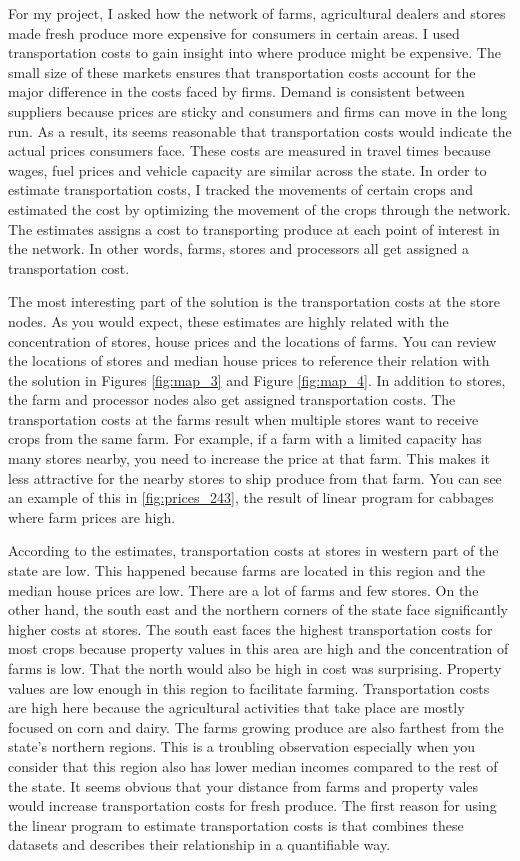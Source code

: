 \documentclass{report}
\begin{document}
For my project, I asked how the network of farms, agricultural dealers and stores made fresh produce more expensive for consumers in certain areas. I used transportation costs to gain insight into where produce might be expensive. The small size of these markets ensures that transportation costs account for the major difference in the costs faced by firms. Demand is consistent between suppliers because prices are sticky and consumers and firms can move in the long run. As a result, its seems reasonable that transportation costs would indicate the actual prices consumers face. These costs are measured in travel times because wages, fuel prices and vehicle capacity are similar across the state. In order to estimate transportation costs, I tracked the movements of certain crops and estimated the cost by optimizing the movement of the crops through the network. The estimates assigns a cost to transporting produce at each point of interest in the network. In other words, farms, stores and processors all get assigned a transportation cost.

The most interesting part of the solution is the transportation costs at the store nodes. As you would expect, these estimates are highly related with the concentration of stores, house prices and the locations of farms. You can review the locations of stores and median house prices to reference their relation with the solution in Figures \ref{fig:map_3} and Figure \ref{fig:map_4}. In addition to stores, the farm and processor nodes also get assigned transportation costs. The transportation costs at the farms result when multiple stores want to receive crops from the same farm. For example, if a farm with a limited capacity has many stores nearby, you need to increase the price at that farm. This makes it less attractive for the nearby stores to ship produce from that farm. You can see an example of this in \ref{fig:prices_243}, the result of linear program for cabbages where farm prices are high.

According to the estimates, transportation costs at stores in western part of the state are low. This happened because farms are located in this region and the median house prices are low. There are a lot of farms and few stores. On the other hand, the south east and the northern corners of the state face significantly higher costs at stores. The south east faces the highest transportation costs for most crops because property values in this area are high and the concentration of farms is low. That the north would also be high in cost was surprising. Property values are low enough in this region to facilitate farming. Transportation costs are high here because the agricultural activities that take place are mostly focused on corn and dairy. The farms growing produce are also farthest from the state's northern regions. This is a troubling observation especially when you consider that this region also has lower median incomes compared to the rest of the state. It seems obvious that your distance from farms and property vales would increase transportation costs for fresh produce. The first reason for using the linear program to estimate transportation costs is that combines these datasets and describes their relationship in a quantifiable way.
\end{document}

